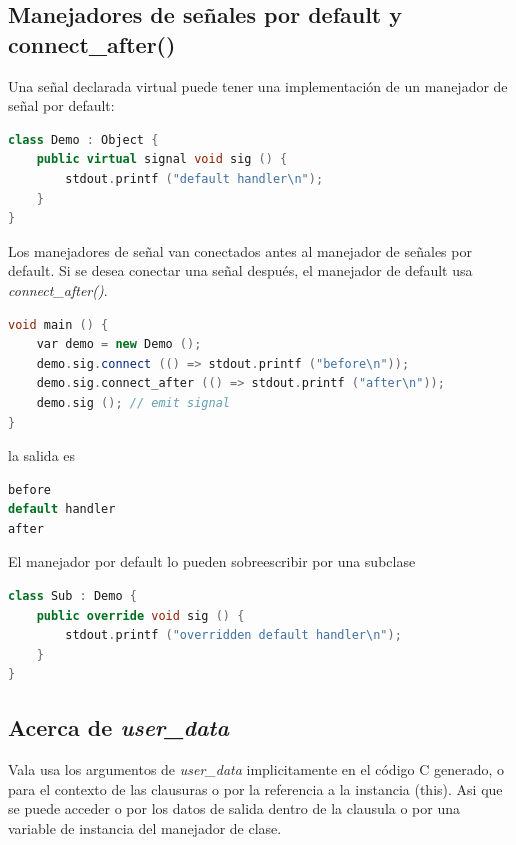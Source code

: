 \documentclass[12pt,twoside]{book}
\begin{document}
\subsection{Manejadores de señales por default y connect\_after()}

Una señal declarada virtual puede tener una implementación de un manejador de señal por default:

\begin{lstlisting}[language=C++]
class Demo : Object {
	public virtual signal void sig () {
		stdout.printf ("default handler\n");
	}
}
\end{lstlisting}

Los manejadores de señal van conectados antes al manejador de señales por default. Si se desea conectar una señal después, el manejador de default usa  \textit{connect\_after()}.

\begin{lstlisting}[language=C++]
void main () {
	var demo = new Demo ();
	demo.sig.connect (() => stdout.printf ("before\n"));
	demo.sig.connect_after (() => stdout.printf ("after\n"));
	demo.sig (); // emit signal
}

\end{lstlisting}

la salida es

\begin{lstlisting}[language=C++]
before
default handler
after
\end{lstlisting}



El manejador por default lo pueden sobreescribir por una subclase

\begin{lstlisting}[language=C++]
class Sub : Demo {
	public override void sig () {
		stdout.printf ("overridden default handler\n");
	}
}
\end{lstlisting}



\subsection{Acerca de \textit{user\_data}}

Vala usa los argumentos de \textit{user\_data} implicitamente en el código C generado, o para el contexto de las clausuras o por la referencia a la instancia (this). Asi que se puede acceder o por los datos de salida dentro de la clausula o por una variable de instancia del manejador de clase.
\end{document}
